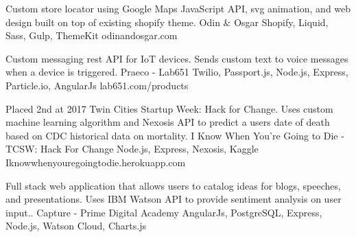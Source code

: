 \documentclass[]{awesome-cv}
\begin{document}
\vspace{-7mm}
\begin{cventries}
	\cventry
	{Custom store locator using Google Maps JavaScript API, svg animation, and web design built on top of existing shopify theme.}
	{Odin \& Osgar}
	{Shopify, Liquid, Sass, Gulp, ThemeKit}
	{odinandosgar.com}
	{}

	\vspace{-5mm}
	\cventry
	{Custom messaging rest API for IoT devices. Sends custom text to voice messages when a device is triggered.}
	{Praeco - Lab651}
	{Twilio, Passport.js, Node.js, Express, Particle.io, AngularJs}
	{lab651.com/products}
	{}

	\vspace{-5mm}
	\cventry
	{Placed 2nd at 2017 Twin Cities Startup Week: Hack for Change. Uses custom machine learning algorithm and Nexosis API to predict a users date of death based on CDC historical data on mortality.}
	{I Know When You’re Going to Die - TCSW: Hack For Change}
	{Node.js, Express, Nexosis, Kaggle}
	{Iknowwhenyouregoingtodie.herokuapp.com}
	{}

	\vspace{-5mm}
	\cventry
	{Full stack web application that allows users to catalog ideas for blogs, speeches, and presentations. Uses IBM Watson API to provide sentiment analysis on user input..}
	{Capture - Prime Digital Academy}
	{AngularJs, PostgreSQL, Express, Node.js, Watson Cloud, Charts.js}
	{}
	{}

	\vspace{-5mm}
\end{cventries}
\end{document}
